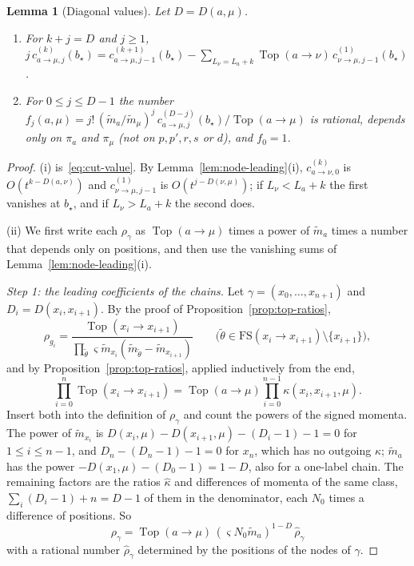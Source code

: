 \documentclass[twoside,10pt]{article}
\numberwithin{equation}{section}
\theoremstyle{slbody}
\newtheorem{lemma}[theorem]{Lemma}
\theoremstyle{definition}
\theoremstyle{remark}
\begin{document}
\begin{lemma}[Diagonal values]\label{lem:diagonal-values}
Let $D=D(a,\mu)$.
\begin{enumerate}
\item[(i)] For $k+j=D$ and $j\geq1$,
$j\,c^{(k)}_{a\to\mu,j}(b_\star)=c^{(k+1)}_{a\to\mu,j-1}(b_\star)
-\sum_{L_\nu=L_a+k}\operatorname{Top}(a\to\nu)\,c^{(1)}_{\nu\to\mu,j-1}(b_\star)$.
\item[(ii)] For $0\leq j\leq D-1$ the number
$f_j(a,\mu)=j!\,(\tilde m_a/\tilde m_\mu)^j\,c^{(D-j)}_{a\to\mu,j}(b_\star)/\operatorname{Top}(a\to\mu)$
is rational, depends only on $\pi_a$ and $\pi_\mu$ (not on $p,p',r,s$ or $d$),
and $f_0=1$.
\end{enumerate}
\end{lemma}

\begin{proof}
(i) is~\eqref{eq:cut-value}.  By Lemma~\ref{lem:node-leading}(i),
$c^{(k)}_{a\to\nu,0}$ is $O(t^{k-D(a,\nu)})$ and $c^{(1)}_{\nu\to\mu,j-1}$ is
$O(t^{j-D(\nu,\mu)})$; if $L_\nu<L_a+k$ the first vanishes at $b_\star$, and if
$L_\nu>L_a+k$ the second does.

(ii) We first write each $\rho_\gamma$ as $\operatorname{Top}(a\to\mu)$ times
a power of $\tilde m_a$ times a number that depends only on positions, and then
use the vanishing sums of Lemma~\ref{lem:node-leading}(i).

\emph{Step 1: the leading coefficients of the chains.}  Let
$\gamma=(x_0,\dots,x_{n+1})$ and $D_i=D(x_i,x_{i+1})$.  By the proof of
Proposition~\ref{prop:top-ratios},
\[
 \rho_{g_i}=\frac{\operatorname{Top}(x_i\to x_{i+1})}
 {\prod_{\tilde\theta}\varsigma\tilde m_{x_i}(\tilde m_{\tilde\theta}-\tilde m_{x_{i+1}})}
 \qquad\bigl(\tilde\theta\in\mathrm{FS}(x_i\to x_{i+1})\setminus\{x_{i+1}\}\bigr),
\]
and by Proposition~\ref{prop:top-ratios}, applied inductively from the end,
\[
 \prod_{i=0}^n\operatorname{Top}(x_i\to x_{i+1})=\operatorname{Top}(a\to\mu)
 \prod_{i=0}^{n-1}\kappa(x_i,x_{i+1},\mu).
\]
Insert both into the definition of $\rho_\gamma$ and count the powers of the
signed momenta.  The power of $\tilde m_{x_i}$ is
$D(x_i,\mu)-D(x_{i+1},\mu)-(D_i-1)-1=0$ for $1\leq i\leq n-1$, and
$D_n-(D_n-1)-1=0$ for $x_n$, which has no outgoing $\kappa$; $\tilde m_a$ has
the power $-D(x_1,\mu)-(D_0-1)=1-D$, also for a one-label chain.  The remaining
factors are the ratios $\hat\kappa$ and differences of momenta of the same
class, $\sum_i(D_i-1)+n=D-1$ of them in the denominator, each $N_0$ times a
difference of positions.  So
\[
 \rho_\gamma=\operatorname{Top}(a\to\mu)\,(\varsigma N_0\tilde m_a)^{1-D}\,\hat\rho_\gamma
\]
with a rational number $\hat\rho_\gamma$ determined by the positions of the
nodes of $\gamma$.


\end{proof}
\end{document}
